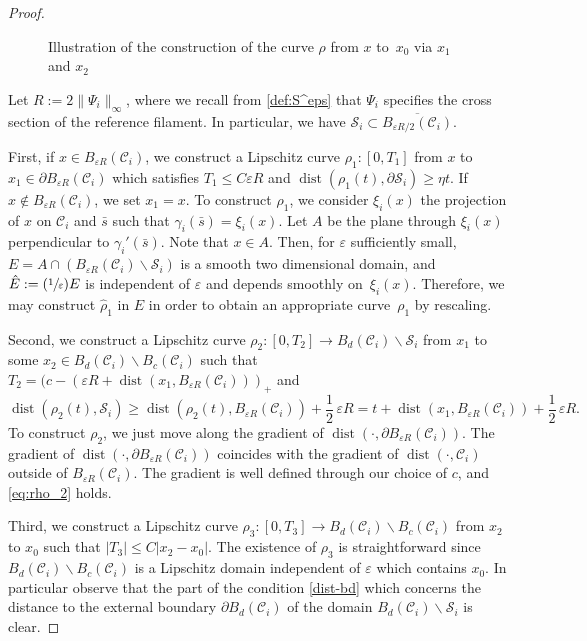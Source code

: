 \documentclass[JEP,XML,SOM,Unicode, NoEqCountersInSection,NoFloatCountersInSection,published]{cedram}
\newcommand{\Psfrac}[2]{(\sfrac{#1}{#2})}
\let\eps\varepsilon
\DeclareMathOperator{\dist}{dist}
\theoremstyle{definition}
\theoremstyle{remark}
\begin{document}
\begin{proof}
\begin{figure}
\begin{tikzpicture}[scale=.9]
\end{tikzpicture}

\caption{\label{fig:John}Illustration of the construction of the curve $\rho$ from $x$ to~$x_0$ via $x_1$ and $x_2$}
\end{figure}

Let $R := 2 \|\Psi_i\|_\infty$, where we recall from \eqref{def:S^eps} that $\Psi_i$ specifies the cross section of the reference filament. In particular, we have $\mathcal S_i \subset \overline{B_{\eps R/2}(\mathcal C_i)}$.

First, if $x \in B_{\eps R}(\mathcal C_i)$, we construct a Lipschitz curve $\rho_1 \colon [0, T_1]$ from $x$ to $x_1 \in \partial B_{\eps R}(\mathcal C_i)$ which satisfies $T_1 \leq C \eps R$ and $\dist(\rho_1(t),\partial \mathcal S_i) \geq \eta t$.
If $x \not \in B_{\eps R}(\mathcal C_i)$, we set $x_1 = x$. To construct $\rho_1$, we consider $\xi_i(x)$ the projection of $x$ on $\mathcal C_i$ and $\bar s$ such that $\gamma_i (\bar s) = \xi_i (x)$. Let $A$ be the plane through $\xi_i(x)$ perpendicular to $\gamma_i'(\bar s)$. Note that $x \in A$.
Then, for $\eps$ sufficiently small, $E = A \cap (B_{\eps R}(\mathcal C_i) \smallsetminus \mathcal S_i)$ is a smooth two dimensional domain, and $\hat E := \Psfrac 1 \eps E$ is independent of $\eps$ and depends smoothly on~$\xi_i(x)$. Therefore, we may construct $\hat \rho_1$ in $\hat E$ in order to obtain an appropriate curve~$\rho_1$ by rescaling.

Second, we construct a Lipschitz curve $\rho_2 \colon [0,T_2] \to B_d(\mathcal
C_i) \smallsetminus \mathcal S_i$ from $x_1$ to some $x_2 \in B_d(\mathcal C_i) \smallsetminus B_c(\mathcal C_i)$
such that $T_2 = (c - (\eps R + \dist(x_1, B_{\eps R}(\mathcal C_i)))_+$ and
\begin{equation} \label{eq:rho_2}
\dist(\rho_2(t), \mathcal S_i) \geq \dist(\rho_2(t), B_{\eps R}(\mathcal C_i)) + \frac 1 2\, \eps R = t + \dist(x_1, B_{\eps R}(\mathcal C_i)) + \frac 1 2\, \eps R.
\end{equation}
To construct $\rho_2$, we just move along the gradient of $\dist(\cdot,\partial B_{\eps R}(\mathcal C_i))$. The gradient
of $\dist(\cdot,\partial B_{\eps R}(\mathcal C_i))$ coincides with the gradient of $\dist(\cdot,\mathcal C_i)$ outside of $B_{\eps R}(\mathcal C_i)$. The gradient is well defined through our choice of $c$, and \eqref{eq:rho_2} holds.

Third, we construct a Lipschitz curve $\rho_3 \colon [0,T_3] \to B_d(\mathcal C_i) \smallsetminus B_c(\mathcal C_i)$ from $x_2$ to $x_0$
such that $|T_3|\leq C|x_2 - x_0|$.
The existence of $\rho_3$ is straightforward since $B_d(\mathcal C_i) \smallsetminus B_c(\mathcal C_i)$ is a Lipschitz domain independent of $\eps$ which contains $x_0$.
In particular observe that the part of the condition \eqref{dist-bd} which concerns the distance to the external boundary $\partial B_d(\mathcal C_i) $ of the domain
$B_d(\mathcal C_i) \smallsetminus \mathcal S_i$ is clear.


\end{proof}
\end{document}
